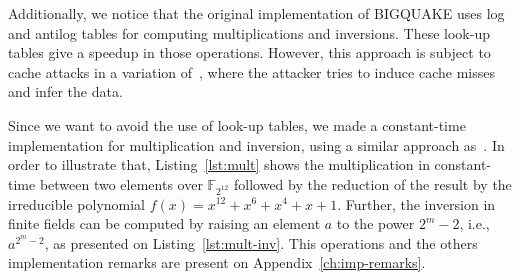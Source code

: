 Additionally, we notice that the original implementation of BIGQUAKE uses log and antilog tables for computing multiplications and inversions. These look-up tables give a speedup in those operations. However, this approach is subject to cache attacks in a variation of~\cite{bruinderink2016flush}, where the attacker tries to induce cache misses and infer the data.

Since we want to avoid the use of look-up tables, we made a constant-time implementation for multiplication and inversion, using a similar approach as~\cite{chou2017mcbits}. In order to illustrate that, Listing~\ref{lst:mult} shows the multiplication in constant-time between two elements over $\mathbb{F}_{2^{12}}$ followed by the reduction of the result by the irreducible polynomial $f(x) = x^{12} + x^6 +x^4 +x + 1$. Further, the inversion in finite fields can be computed by raising an element $a$ to the power $2^{m}-2$, i.e., $a^{2^{m}-2}$, as presented on Listing~\ref{lst:mult-inv}. This operations and the others implementation remarks are present on Appendix~\ref{ch:imp-remarks}.



